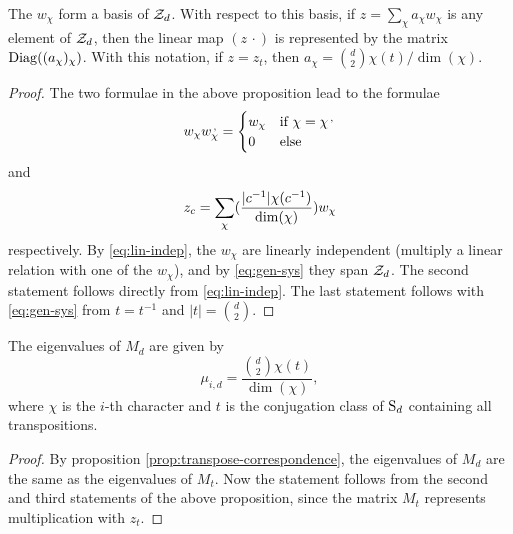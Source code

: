 \begin{prop} \label{prop:simultaneous-eigenvectors}
 The $w_\chi$ form a basis of $\mathcal{Z}_d$. With respect to this basis, if $z=\sum_\chi a_\chi w_\chi$ is any element of $\mathcal{Z}_d$, then the linear map $(z\,\cdot)$ is represented by the matrix $\operatorname{Diag}((a_\chi)_\chi)$. With this notation, if $z=z_t$, then $a_\chi=\binom{d}{2} \chi({t})/\dim({\chi})$. 
\end{prop}
\begin{proof}
 The two formulae in the above proposition lead to the formulae
 \begin{equation} \label{eq:lin-indep}
  w_\chi w_\chi^\textrm{\,,} =
  \begin{cases} w_\chi &\mbox{if } \chi = \chi^\textrm{\,,} \\
                     0 &\mbox{else}
  \end{cases}
 \end{equation}
 and
 \begin{equation} \label{eq:gen-sys}
  z_c=\sum_{\chi}(\frac{|c^{-1}|\chi(c^{-1})}{\dim(\chi)})w_\chi
 \end{equation}
 respectively.
 By \eqref{eq:lin-indep}, the $w_\chi$ are linearly independent (multiply a linear relation with one of the $w_\chi$), and by \eqref{eq:gen-sys} they span $\mathcal{Z}_d$.
 The second statement follows directly from \eqref{eq:lin-indep}. The last statement follows with \eqref{eq:gen-sys} from $t=t^{-1}$ and $|t|=\binom{d}{2}$.
\end{proof}

\begin{lemma} \label{prop:eigenvalues}
 The eigenvalues of $M_d$ are given by \[\mu_{i,d}=\frac{\binom{d}{2} \chi(t)}{\dim(\chi)},\] where $\chi$ is the $i$-th character and $t$ is the conjugation class of $\operatorname{S}_d$ containing all transpositions.
\end{lemma}
\begin{proof}
 By proposition \ref{prop:transpose-correspondence}, the eigenvalues of $M_d$ are the same as the eigenvalues of $M_t$. Now the statement follows from the second and third statements of the above proposition, since the matrix $M_t$ represents multiplication with $z_t$.
\end{proof}